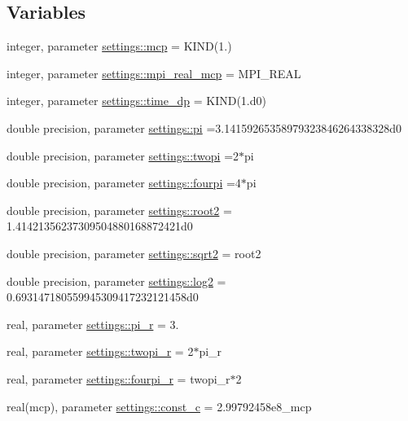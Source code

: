 \subsection*{Variables}
\begin{DoxyCompactItemize}
\item 
integer, parameter \mbox{\hyperlink{namespacesettings_a341fa0fe410054f78630c33e118669bf}{settings\+::mcp}} = K\+I\+ND(1.)
\item 
integer, parameter \mbox{\hyperlink{namespacesettings_aa6d55f83efe636882451ee1240bf4929}{settings\+::mpi\+\_\+real\+\_\+mcp}} = M\+P\+I\+\_\+\+R\+E\+AL
\item 
integer, parameter \mbox{\hyperlink{namespacesettings_a3d81f31b9e0eef8de19fb9b016043af7}{settings\+::time\+\_\+dp}} = K\+I\+ND(1.d0)
\item 
double precision, parameter \mbox{\hyperlink{namespacesettings_a57710b73441b5ec0babcaa48cd333055}{settings\+::pi}} =3.\+14159265358979323846264338328d0
\item 
double precision, parameter \mbox{\hyperlink{namespacesettings_a22fb9d779d16c940a845d5da795ef6ec}{settings\+::twopi}} =2$\ast$pi
\item 
double precision, parameter \mbox{\hyperlink{namespacesettings_ad4683f1ccdfb64cdf9aa5643ce991cd5}{settings\+::fourpi}} =4$\ast$pi
\item 
double precision, parameter \mbox{\hyperlink{namespacesettings_a54504c6d9151b9990bf3f15deeaa139b}{settings\+::root2}} = 1.\+41421356237309504880168872421d0
\item 
double precision, parameter \mbox{\hyperlink{namespacesettings_a46452645879c3ed6edc6b31e79786d63}{settings\+::sqrt2}} = root2
\item 
double precision, parameter \mbox{\hyperlink{namespacesettings_a9020a6ca0bbe74043ff8103f9f8ece1d}{settings\+::log2}} = 0.\+693147180559945309417232121458d0
\item 
real, parameter \mbox{\hyperlink{namespacesettings_a6fe3b2dcac06d9e51592e885f64ace1d}{settings\+::pi\+\_\+r}} = 3.
\item 
real, parameter \mbox{\hyperlink{namespacesettings_a87b6f8cb970e358fc23b950e8db62257}{settings\+::twopi\+\_\+r}} = 2$\ast$pi\+\_\+r
\item 
real, parameter \mbox{\hyperlink{namespacesettings_a84f03a75cdf655bea4a1568443921c37}{settings\+::fourpi\+\_\+r}} = twopi\+\_\+r$\ast$2
\item 
real(mcp), parameter \mbox{\hyperlink{namespacesettings_a9aec23a6e1d47760b93c79084ddacd3c}{settings\+::const\+\_\+c}} = 2.\+99792458e8\+\_\+mcp

\end{DoxyCompactItemize}
